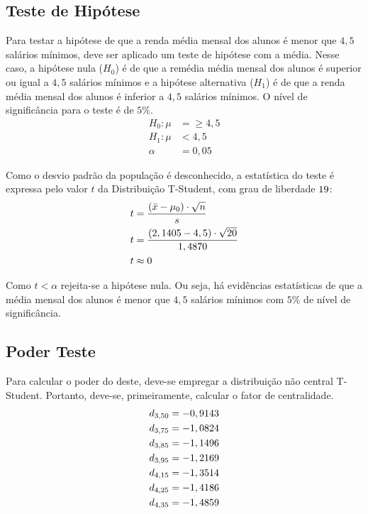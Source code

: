 

\subsection{Teste de Hipótese}

	Para testar a hipótese de que a renda média mensal dos alunos é menor
	que $4,5$ salários mínimos, deve ser aplicado um teste de hipótese com a
	média. Nesse caso, a hipótese nula ($H_0$) é de que a remédia média mensal dos
	alunos é superior ou igual a $4,5$ salários mínimos e a hipótese alternativa
	($H_1$) é de que a renda média mensal dos alunos é inferior a $4,5$ salários
	mínimos. O nível de significância para o teste é de $5\%$.
	\begin{align*}
		H_0: \mu &= \geq 4,5\\
		H_1: \mu &< 4,5   \\
		     \alpha &= 0,05
	\end{align*}

	Como o desvio padrão da população é desconhecido, a estatística do
	teste é expressa pelo valor $t$ da Distribuição T-Student, com grau de
	liberdade $19$:
	\begin{align*}
		t &= \frac{(\bar{x} - \mu_0)\cdot\sqrt{n}}{s} \\
		t &= \dfrac{(2,1405 - 4,5) \cdot \sqrt{20}}{1,4870} \\
		t &\approx 0
	\end{align*}

	Como $t < \alpha$ rejeita-se a hipótese nula. Ou seja, há evidências
	estatísticas de que a média mensal dos alunos é menor que $4,5$ salários
	mínimos com $5\%$ de nível de significância.

\subsection{Poder Teste}

	Para calcular o poder do deste, deve-se empregar a distribuição não
	central T-Student. Portanto, deve-se, primeiramente, calcular o fator de
	centralidade.
	\begin{align*}
		d_{3,50} &= -0,9143\\
		d_{3,75} &= -1,0824\\
		d_{3,85} &= -1,1496\\
		d_{3,95} &= -1,2169\\
		d_{4,15} &= -1,3514\\
		d_{4,25} &= -1,4186\\
		d_{4,35} &= -1,4859\\
	\end{align*}
	
